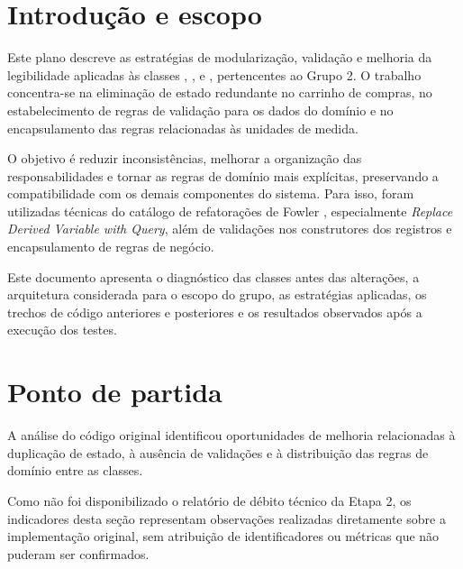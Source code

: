
\graphicspath{{../../}}



\tableofcontents\newpage

\section{Introdução e escopo}

Este plano descreve as estratégias de modularização, validação e melhoria da legibilidade aplicadas às classes , ,  e , pertencentes ao Grupo 2. O trabalho concentra-se na eliminação de estado redundante no carrinho de compras, no estabelecimento de regras de validação para os dados do domínio e no encapsulamento das regras relacionadas às unidades de medida.

O objetivo é reduzir inconsistências, melhorar a organização das responsabilidades e tornar as regras de domínio mais explícitas, preservando a compatibilidade com os demais componentes do sistema. Para isso, foram utilizadas técnicas do catálogo de refatorações de Fowler \cite{fowler2020}, especialmente \textit{Replace Derived Variable with Query}, além de validações nos construtores dos registros e encapsulamento de regras de negócio.

Este documento apresenta o diagnóstico das classes antes das alterações, a arquitetura considerada para o escopo do grupo, as estratégias aplicadas, os trechos de código anteriores e posteriores e os resultados observados após a execução dos testes.

\section{Ponto de partida}

A análise do código original identificou oportunidades de melhoria relacionadas à duplicação de estado, à ausência de validações e à distribuição das regras de domínio entre as classes.

Como não foi disponibilizado o relatório de débito técnico da Etapa 2, os indicadores desta seção representam observações realizadas diretamente sobre a implementação original, sem atribuição de identificadores ou métricas que não puderam ser confirmados.

